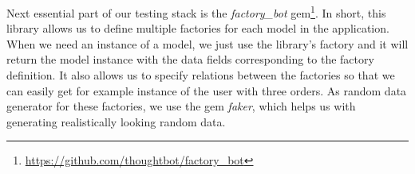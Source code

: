 Next essential part of our testing stack is  the \textit{factory\_bot} gem\footnote{\url{https://github.com/thoughtbot/factory_bot}}. In short, this library allows us to define multiple factories for each model in the application. When we need an instance of a model, we just use the library's factory and it will return the model instance with the data fields corresponding to the factory definition. It also allows us to specify relations between the factories so that we can easily get for example instance of the user with three orders. As random data generator for these factories, we use the gem \textit{faker}, which helps us with generating realistically looking random data.